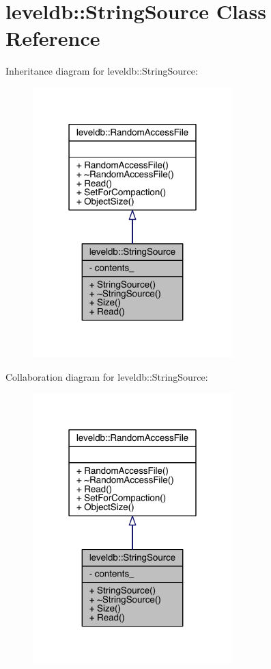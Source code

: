 \hypertarget{classleveldb_1_1_string_source}{}\section{leveldb\+:\+:String\+Source Class Reference}
\label{classleveldb_1_1_string_source}


Inheritance diagram for leveldb\+:\+:String\+Source\+:\nopagebreak
\begin{figure}[H]
\begin{center}
\leavevmode
\includegraphics[width=219pt]{classleveldb_1_1_string_source__inherit__graph}
\end{center}
\end{figure}


Collaboration diagram for leveldb\+:\+:String\+Source\+:\nopagebreak
\begin{figure}[H]
\begin{center}
\leavevmode
\includegraphics[width=219pt]{classleveldb_1_1_string_source__coll__graph}
\end{center}
\end{figure}
